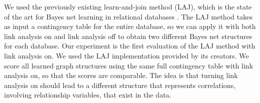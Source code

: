 \documentclass{acm_proc_article-sp}
\begin{document}
We used the previously existing learn-and-join method (LAJ), which is the state of the art for Bayes net learning in relational databases \cite{Schulte2012}. The LAJ method takes as input a contingency table for the entire database, so we can apply it with both link analysis on and link analysis off to obtain two different Bayes net structures for each database. Our experiment is the first evaluation of the LAJ method with link analysis on. We used the LAJ implementation provided by its creators.
%
%
We score all learned graph structures using the same full contingency table with link analysis on, so that the scores are comparable. The idea is that turning link analysis on should lead to a different structure that represents correlations, involving relationship variables, that exist in the data.
\end{document}
